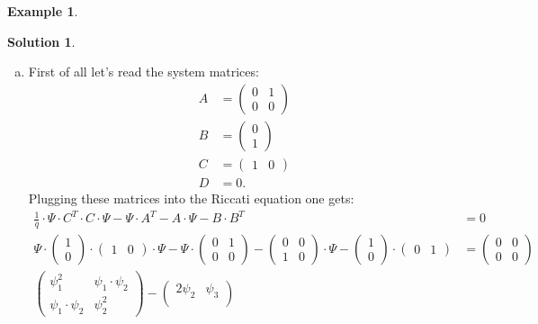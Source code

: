 \documentclass[a4paper,12 pt]{article}
\numberwithin{equation}{section}
\theoremstyle{definition}
\newtheorem{bsp}{Example}
\theoremstyle{remark}
\theoremstyle{definition}
\newtheorem*{lsg}{Solution}
\theoremstyle{definition}
\theoremstyle{definition}
\theoremstyle{remark}
\begin{document}
\begin{bsp}
\begin{lsg}
\begin{enumerate}[(a)]
\item First of all let's read the system matrices:
\begin{equation*}
\begin{split}
A&=\begin{pmatrix}
0&1\\ 0&0
\end{pmatrix}\\
B&=\begin{pmatrix}
0\\ 1\end{pmatrix}\\
C&=\begin{pmatrix} 1&0 \end{pmatrix} \\
D&=0.
\end{split}
\end{equation*}
Plugging these matrices into the Riccati equation one gets:
\begin{equation*}
\begin{split}
\frac{1}{q}\cdot \Psi \cdot C^T \cdot C \cdot \Psi - \Psi \cdot A^T -A\cdot \Psi - B\cdot B^T&=0\\
\Psi \cdot \begin{pmatrix} 1\\ 0\end{pmatrix}\cdot \begin{pmatrix} 1&0 \end{pmatrix} \cdot \Psi- \Psi \cdot \begin{pmatrix}
0&1\\ 0&0
\end{pmatrix}-\begin{pmatrix}
0&0\\ 1&0
\end{pmatrix}\cdot \Psi-\begin{pmatrix} 1\\ 0\end{pmatrix}\cdot \begin{pmatrix} 0&1\end{pmatrix}&=\begin{pmatrix} 0&0\\ 0&0 \end{pmatrix}\\
\begin{pmatrix}
\psi_1^2& \psi_1\cdot \psi_2 \\
\psi_1\cdot \psi_2 & \psi_2^2
\end{pmatrix}-\begin{pmatrix}
2\psi_2 & \psi_3 \\

\end{pmatrix}
\end{split}
\end{equation*}
\end{enumerate}
\end{lsg}
\end{bsp}
\end{document}
